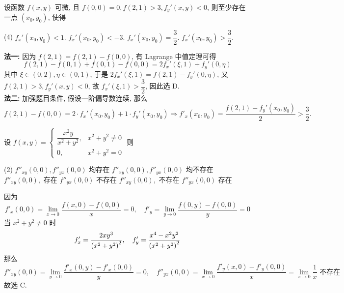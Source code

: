 \begin{example}
    设函数 $f(x,y)$ 可微, 且 $f(0,0)=0, f(2,1)>3, f_y'(x,y)<0$, 则至少存在一点 $(x_0,y_0)$, 使得 
    \begin{tasks}(4)
        \task $f_x'(x_0,y_0)<1.$
        \task $f_x'(x_0,y_0)<-3.$
        \task $f_x'(x_0,y_0)=\dfrac{3}{2}.$
        \task $f_x'(x_0,y_0)>\dfrac{3}{2}.$
    \end{tasks}
\end{example}
\begin{solution}
    \textbf{法一: }因为 $f(2,1)=f(2,1)-f(0,0)$, 有 Lagrange 中值定理可得 
    $$
    f(2,1)-f(0,1)+f(0,1)-f(0,0)=2f_x'(\xi,1)+f_y'(0, \eta)
    $$
    其中 $\xi\in(0,2),\eta\in(0,1)$, 于是 $2f_x'(\xi,1)=f(2,1)-f_y'(0,\eta)$, 又 $f(2,1)>3, f_y'(x,y)<0$, 故 $f_x'(\xi,1)>\dfrac{3}{2}$, 因此选 D. \\ 
    \textbf{法二: }加强题目条件, 假设一阶偏导数连续, 那么 $$
    f(2,1)-f(0,0)=2\cdot f_x'(x_0,y_0)+1\cdot f_y'(x_0,y_0)\Rightarrow f'_x(x_0,y_0)=\dfrac{f(2,1)-f_y'(x_0,y_0)}{2}>\dfrac{3}{2}.
    $$
\end{solution}

\begin{example}
    设 $f(x,y)=\begin{cases}
            \dfrac{x^2y}{x^2+y^2}, & x^2+y^2\neq 0 \\
            0,                     & x^2+y^2=0
        \end{cases}$ 则
    \begin{tasks}(2)
        \task $f''_{xy}(0,0), f''_{yx}(0,0)$ 均存在
        \task $f''_{xy}(0,0), f''_{yx}(0,0)$ 均不存在
        \task $f''_{xy}(0,0), $ 存在 $ f''_{yx}(0,0)$ 不存在
        \task $f''_{xy}(0,0), $ 不存在 $ f''_{yx}(0,0)$ 存在
    \end{tasks}
\end{example}
\begin{solution}
    因为 $$
        f'_x(0,0)=\lim_{x \to 0}\dfrac{f(x,0)-f(0,0)}{x}=0,\quad f'_y=\lim_{y \to 0}\dfrac{f(0,y)-f(0,0)}{y}=0
    $$
    当 $x^2+y^2\neq 0$ 时
    $$
        f'_x=\dfrac{2xy^3}{\qty(x^2+y^2)^2},\quad f'_y=\dfrac{x^4-x^2y^2}{\qty(x^2+y^2)^2}
    $$
    那么 $$
        f''_{xy}(0,0)=\lim_{y \to 0}\dfrac{f'_x(0,y)-f'_x(0,0)}{y}=0,\quad f''_{yx}(0,0)=\lim_{x \to 0}\dfrac{f'_y(x,0)-f'_y(0,0)}{x}=\lim_{x \to 0}\dfrac{1}{x}\text{ 不存在}
    $$
    故选 C.
\end{solution}

